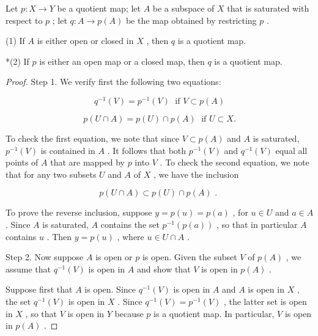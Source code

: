 \begin{theorem} Let \(p : X \rightarrow  Y\) be a quotient map; let \(A\) be a subspace of \(X\) that is saturated with respect to \(p\) ; let \(q : A \rightarrow  p\left( A\right)\) be the map obtained by restricting \(p\) .

(1) If \(A\) is either open or closed in \(X\) , then \(q\) is a quotient map.

*(2) If \(p\) is either an open map or a closed map, then \(q\) is a quotient map.

\end{theorem}
\begin{proof}
Step 1. We verify first the following two equations:

\[
{q}^{-1}\left( V\right)  = {p}^{-1}\left( V\right) \;\text{ if }V \subset  p\left( A\right)
\]

\[
p\left( {U \cap  A}\right)  = p\left( U\right)  \cap  p\left( A\right) \;\text{ if }U \subset  X.
\]

To check the first equation, we note that since \(V \subset  p\left( A\right)\) and \(A\) is saturated, \({p}^{-1}\left( V\right)\) is contained in \(A\) . It follows that both \({p}^{-1}\left( V\right)\) and \({q}^{-1}\left( V\right)\) equal all points of \(A\) that are mapped by \(p\) into \(V\) . To check the second equation, we note that for any two subsets \(U\) and \(A\) of \(X\) , we have the inclusion

\[
p\left( {U \cap  A}\right)  \subset  p\left( U\right)  \cap  p\left( A\right) \text{ . }
\]

To prove the reverse inclusion, suppose \(y = p\left( u\right)  = p\left( a\right)\) , for \(u \in  U\) and \(a \in  A\) . Since \(A\) is saturated, \(A\) contains the set \({p}^{-1}\left( {p\left( a\right) }\right)\) , so that in particular \(A\) contains \(u\) . Then \(y = p\left( u\right)\) , where \(u \in  U \cap  A\) .

Step 2. Now suppose \(A\) is open or \(p\) is open. Given the subset \(V\) of \(p\left( A\right)\) , we assume that \({q}^{-1}\left( V\right)\) is open in \(A\) and show that \(V\) is open in \(p\left( A\right)\) .

Suppose first that \(A\) is open. Since \({q}^{-1}\left( V\right)\) is open in \(A\) and \(A\) is open in \(X\) , the set \({q}^{-1}\left( V\right)\) is open in \(X\) . Since \({q}^{-1}\left( V\right)  = {p}^{-1}\left( V\right)\) , the latter set is open in \(X\) , so that \(V\) is open in \(Y\) because \(p\) is a quotient map. In particular, \(V\) is open in \(p\left( A\right)\) .


\end{proof}
